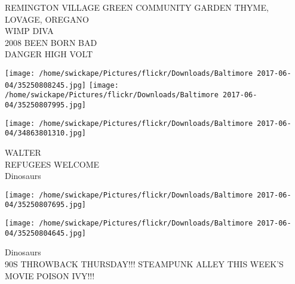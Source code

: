 \documentclass[10pt,letterpaper]{article}
\begin{document}
REMINGTON VILLAGE GREEN COMMUNITY GARDEN THYME, LOVAGE, OREGANO\\
WIMP DIVA\\
2008 BEEN BORN BAD\\
DANGER HIGH VOLT\\
\pagebreak

\texttt{[image: /home/swickape/Pictures/flickr/Downloads/Baltimore 2017-06-04/35250808245.jpg]}
\texttt{[image: /home/swickape/Pictures/flickr/Downloads/Baltimore 2017-06-04/35250807995.jpg]}

\vspace{0.25in}
\texttt{[image: /home/swickape/Pictures/flickr/Downloads/Baltimore 2017-06-04/34863801310.jpg]}

WALTER\\
REFUGEES WELCOME\\
Dinosaurs\\
\pagebreak

\texttt{[image: /home/swickape/Pictures/flickr/Downloads/Baltimore 2017-06-04/35250807695.jpg]}

\vspace{0.25in}
\texttt{[image: /home/swickape/Pictures/flickr/Downloads/Baltimore 2017-06-04/35250804645.jpg]}

Dinosaurs\\
90S THROWBACK THURSDAY!!! STEAMPUNK ALLEY THIS WEEK'S MOVIE POISON IVY!!!\\
\pagebreak
\end{document}
